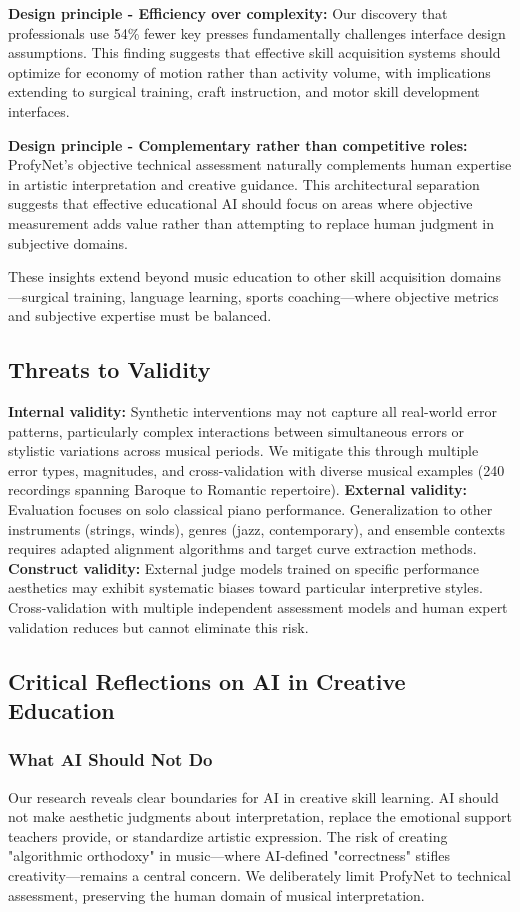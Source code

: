 \documentclass[sigconf,review,anonymous]{acmart}
\begin{document}
\textbf{Design principle - Efficiency over complexity:} Our discovery that professionals use 54\% fewer key presses fundamentally challenges interface design assumptions. This finding suggests that effective skill acquisition systems should optimize for economy of motion rather than activity volume, with implications extending to surgical training, craft instruction, and motor skill development interfaces.

\textbf{Design principle - Complementary rather than competitive roles:} ProfyNet's objective technical assessment naturally complements human expertise in artistic interpretation and creative guidance. This architectural separation suggests that effective educational AI should focus on areas where objective measurement adds value rather than attempting to replace human judgment in subjective domains.

These insights extend beyond music education to other skill acquisition domains—surgical training, language learning, sports coaching—where objective metrics and subjective expertise must be balanced.

\subsection{Threats to Validity}
\textbf{Internal validity:} Synthetic interventions may not capture all real-world error patterns, particularly complex interactions between simultaneous errors or stylistic variations across musical periods. We mitigate this through multiple error types, magnitudes, and cross-validation with diverse musical examples (240 recordings spanning Baroque to Romantic repertoire).
\textbf{External validity:} Evaluation focuses on solo classical piano performance. Generalization to other instruments (strings, winds), genres (jazz, contemporary), and ensemble contexts requires adapted alignment algorithms and target curve extraction methods.
\textbf{Construct validity:} External judge models trained on specific performance aesthetics may exhibit systematic biases toward particular interpretive styles. Cross-validation with multiple independent assessment models and human expert validation reduces but cannot eliminate this risk.

\subsection{Critical Reflections on AI in Creative Education}

\subsubsection{What AI Should Not Do}
Our research reveals clear boundaries for AI in creative skill learning. AI should not make aesthetic judgments about interpretation, replace the emotional support teachers provide, or standardize artistic expression. The risk of creating "algorithmic orthodoxy" in music—where AI-defined "correctness" stifles creativity—remains a central concern. We deliberately limit ProfyNet to technical assessment, preserving the human domain of musical interpretation.
\end{document}
